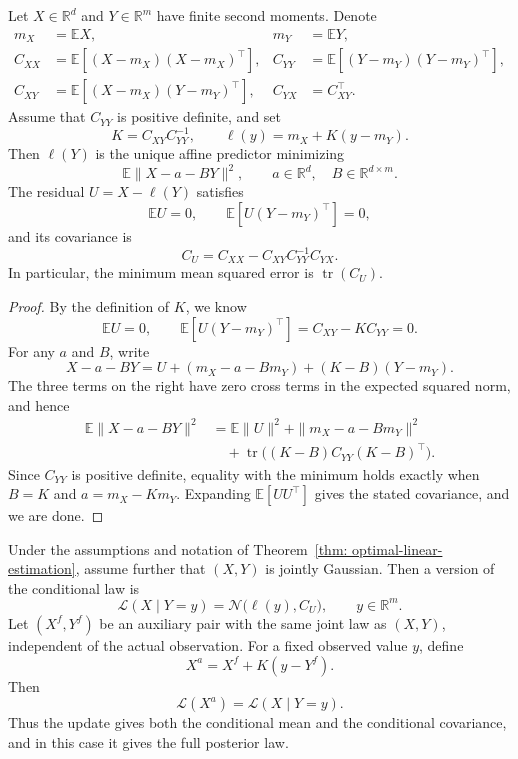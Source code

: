 \begin{theorem}
\label{thm: optimal-linear-estimation}
Let $X\in\mathbb R^d$ and $Y\in\mathbb R^m$ have finite second
moments. Denote
\[
\begin{aligned}
    m_X&=\mathbb EX, & m_Y&=\mathbb EY,\\
    C_{XX}&=\mathbb E[(X-m_X)(X-m_X)^\top], &
    C_{YY}&=\mathbb E[(Y-m_Y)(Y-m_Y)^\top],\\
    C_{XY}&=\mathbb E[(X-m_X)(Y-m_Y)^\top], &
    C_{YX}&=C_{XY}^\top.
\end{aligned}
\]
Assume that $C_{YY}$ is positive definite, and set
\[
    K=C_{XY}C_{YY}^{-1},\qquad
    \ell(y)=m_X+K(y-m_Y).
\]
Then $\ell(Y)$ is the unique affine predictor minimizing
\[
    \mathbb E\|X-a-BY\|^2,
    \qquad a\in\mathbb R^d,\quad B\in\mathbb R^{d\times m}.
\]
The residual $U=X-\ell(Y)$ satisfies
\[
    \mathbb EU=0,\qquad
    \mathbb E[U(Y-m_Y)^\top]=0,
\]
and its covariance is
\[
    C_U=C_{XX}-C_{XY}C_{YY}^{-1}C_{YX}.
\]
In particular, the minimum mean squared error is
$\operatorname{tr}(C_U)$.
\end{theorem}

\begin{proof}
By the definition of $K$, we know
\[
    \mathbb EU=0,\qquad
    \mathbb E[U(Y-m_Y)^\top]=C_{XY}-KC_{YY}=0.
\]
For any $a$ and $B$, write
\[
    X-a-BY
    =U+(m_X-a-Bm_Y)+(K-B)(Y-m_Y).
\]
The three terms on the right have zero cross terms in the expected
squared norm, and hence
\[
\begin{aligned}
    \mathbb E\|X-a-BY\|^2
    &=\mathbb E\|U\|^2+\|m_X-a-Bm_Y\|^2\\
    &\quad+\operatorname{tr}\bigl((K-B)C_{YY}(K-B)^\top\bigr).
\end{aligned}
\]
Since $C_{YY}$ is positive definite, equality with the minimum holds
exactly when $B=K$ and $a=m_X-Km_Y$. Expanding
$\mathbb E[UU^\top]$ gives the stated covariance, and we are done.
\end{proof}

\begin{proposition}
\label{prop: gaussian-posterior-update}
Under the assumptions and notation of
Theorem~\ref{thm: optimal-linear-estimation}, assume further that
$(X,Y)$ is jointly Gaussian. Then a version of the conditional law is
\[
    \mathcal L(X\mid Y=y)
    =\mathcal N\bigl(\ell(y),C_U\bigr),
    \qquad y\in\mathbb R^m.
\]
Let $(X^f,Y^f)$ be an auxiliary pair with the same joint law as $(X,Y)$,
independent of the actual observation. For a fixed observed value $y$,
define
\[
    X^a=X^f+K(y-Y^f).
\]
Then
\[
    \mathcal L(X^a)=\mathcal L(X\mid Y=y).
\]
Thus the update gives both the conditional mean and the conditional
covariance, and in this case it gives the full posterior law.
\end{proposition}

